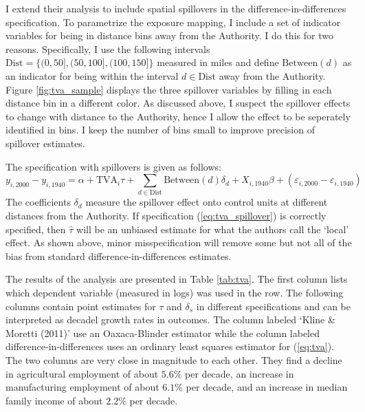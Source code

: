 \documentclass[11pt]{article}
\begin{document}
I extend their analysis to include spatial spillovers in the difference-in-differences specification. To parametrize the exposure mapping, I include a set of indicator variables for being in distance bins away from the Authority. I do this for two reasons. Specifically, I use the following intervals $\text{Dist} = \{(0, 50], (50, 100], (100, 150]\}$ measured in miles and define $\text{Between}(d)$ as an indicator for being within the interval $d \in \text{Dist}$ away from the Authority. Figure \ref{fig:tva_sample} displays the three spillover variables by filling in each distance bin in a different color. As discussed above, I suspect the spillover effects to change with distance to the Authority, hence I allow the effect to be seperately identified in bins. I keep the number of bins small to improve precision of spillover estimates. 

The specification with spillovers is given as follows:  
\begin{equation}\label{eq:tva_spillover}
    y_{i, 2000} - y_{i, 1940} = \alpha + \text{TVA}_i \tau + \sum_{d \in \text{Dist}} \text{Between}(d)\delta_d + X_{i, 1940} \beta + (\varepsilon_{i, 2000} - \varepsilon_{i, 1940})
\end{equation} 
The coefficients $\delta_d$ measure the spillover effect onto control units at different distances from the Authority. If specification (\ref{eq:tva_spillover}) is correctly specified, then $\hat{\tau}$ will be an unbiased estimate for what the authors call the `local' effect. As shown above, minor misspecification will remove some but not all of the bias from standard difference-in-differences estimates. 

The results of the analysis are presented in Table \ref{tab:tva}. The first column lists which dependent variable (measured in logs) was used in the row. The following columns contain point estimates for $\tau$ and $\delta_s$ in different specifications and can be interpreted as decadel growth rates in outcomes. The column labeled `Kline \& Moretti (2011)' use an Oaxaca-Blinder estimator while the column labeled difference-in-differences uses an ordinary least squares estimator for (\ref{eq:tva}). The two columns are very close in magnitude to each other. They find a decline in agricultural employment of about $5.6\%$ per decade, an increase in manufacturing employment of about $6.1\%$ per decade, and an increase in median family income of about $2.2\%$ per decade. 
\end{document}
